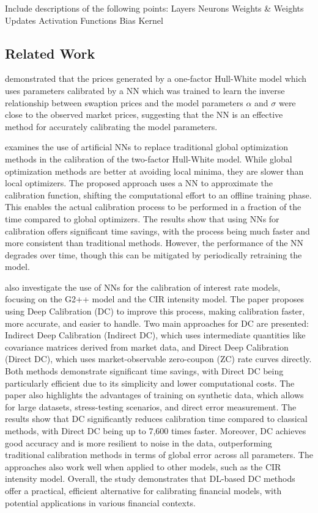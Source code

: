 Include descriptions of the following points:
Layers
Neurons
Weights \& Weights Updates
Activation Functions
Bias
Kernel


\subsection{Related Work}
\textcite{alvarez2022hullwhite} demonstrated that the prices generated by a one-factor Hull-White model which uses parameters calibrated by a NN which was trained to learn the inverse relationship between swaption prices and the model parameters $\alpha$ and $\sigma$ were close to the observed market prices, suggesting that the NN is an effective method for accurately calibrating the model parameters.

\textcite{hernandez2016model} examines the use of artificial NNs to replace traditional global optimization methods in the calibration of the two-factor Hull-White model. While global optimization methods are better at avoiding local minima, they are slower than local optimizers. The proposed approach uses a NN to approximate the calibration function, shifting the computational effort to an offline training phase. This enables the actual calibration process to be performed in a fraction of the time compared to global optimizers. The results show that using NNs for calibration offers significant time savings, with the process being much faster and more consistent than traditional methods. However, the performance of the NN degrades over time, though this can be mitigated by periodically retraining the model.

\textcite{alaya2021deep} also investigate the use of NNs for the calibration of interest rate models, focusing on the G2++ model and the CIR intensity model. The paper proposes using Deep Calibration (DC) to improve this process, making calibration faster, more accurate, and easier to handle. Two main approaches for DC are presented: Indirect Deep Calibration (Indirect DC), which uses intermediate quantities like covariance matrices derived from market data, and Direct Deep Calibration (Direct DC), which uses market-observable zero-coupon (ZC) rate curves directly. Both methods demonstrate significant time savings, with Direct DC being particularly efficient due to its simplicity and lower computational costs. The paper also highlights the advantages of training on synthetic data, which allows for large datasets, stress-testing scenarios, and direct error measurement. The results show that DC significantly reduces calibration time compared to classical methods, with Direct DC being up to 7,600 times faster. Moreover, DC achieves good accuracy and is more resilient to noise in the data, outperforming traditional calibration methods in terms of global error across all parameters. The approaches also work well when applied to other models, such as the CIR intensity model. Overall, the study demonstrates that DL-based DC methods offer a practical, efficient alternative for calibrating financial models, with potential applications in various financial contexts.

